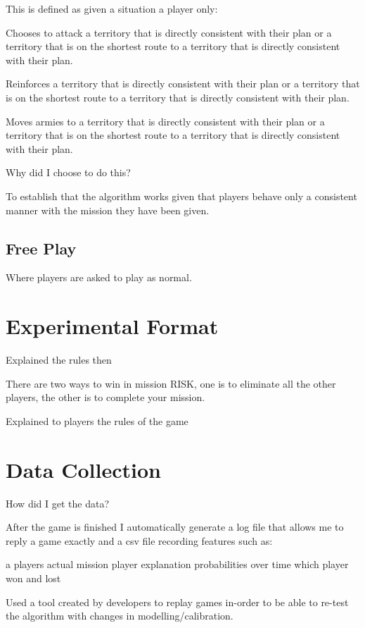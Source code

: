 \documentclass[parskip]{cs4rep}
\begin{document}
This is defined as given a situation a player only:

Chooses to attack a territory that is directly consistent with their plan or a territory that is on the shortest route to a territory that is directly consistent with their plan.

Reinforces a territory that is directly consistent with their plan or a territory that is on the shortest route to a territory that is directly consistent with their plan.

Moves armies to a territory that is directly consistent with their plan or a territory that is on the shortest route to a territory that is directly consistent with their plan.

Why did I choose to do this?

To establish that the algorithm works given that players behave only a consistent manner with the mission they have been given.

\subsection{Free Play}

Where players are asked to play as normal.

\section{Experimental Format}

Explained the rules then

There are two ways to win in mission RISK, one is to eliminate all the other players, the other is to complete your mission.

Explained to players the rules of the game 

\section{Data Collection}

How did I get the data?

After the game is finished I automatically generate a log file that allows me to reply a game exactly and a csv file recording features such as:

a players actual mission
player explanation probabilities over time
which player won and lost

Used a tool created by developers to replay games in-order to be able to re-test the algorithm with changes in modelling/calibration.
\end{document}
